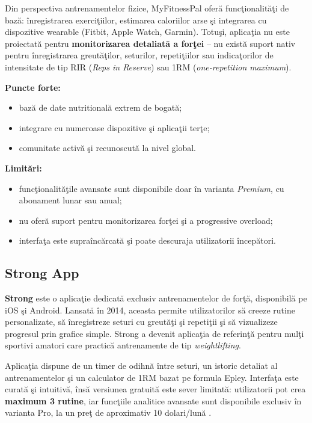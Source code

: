 Din perspectiva antrenamentelor fizice, MyFitnessPal ofer\u a func\c tionalit\u a\c ti
de baz\u a: \^ inregistrarea exerci\c tiilor, estimarea caloriilor arse \c si
integrarea cu dispozitive wearable (Fitbit, Apple Watch, Garmin). Totu\c si,
aplica\c tia nu este proiectat\u a pentru \textbf{monitorizarea detaliat\u a a
for\c tei} -- nu exist\u a suport nativ pentru \^ inregistrarea greut\u a\c tilor,
seturilor, repeti\c tiilor sau indica\c torilor de intensitate de tip RIR
(\textit{Reps in Reserve}) sau 1RM (\textit{one-repetition maximum}).

\textbf{Puncte forte:}
\begin{itemize}
  \item baz\u a de date nutritional\u a extrem de bogat\u a;
  \item integrare cu numeroase dispozitive \c si aplica\c tii ter\c te;
  \item comunitate activ\u a \c si recunoscut\u a la nivel global.
\end{itemize}

\textbf{Limit\u ari:}
\begin{itemize}
  \item func\c tionalit\u a\c tile avansate sunt disponibile doar \^ in varianta
        \textit{Premium}, cu abonament lunar sau anual;
  \item nu ofer\u a suport pentru monitorizarea for\c tei \c si a
        progressive overload;
  \item interfa\c ta este supra\^ inc\u arcat\u a \c si poate descuraja
        utilizatorii \^ incep\u atori.
\end{itemize}

\subsection{Strong App}

\textbf{Strong} \cite{strongapp2024} este o aplica\c tie dedicat\u a exclusiv
antrenamentelor de for\c t\u a, disponibil\u a pe iOS \c si Android. Lansat\u a
\^ in 2014, aceasta permite utilizatorilor s\u a creeze rutine personalizate,
s\u a \^ inregistreze seturi cu greut\u a\c ti \c si repeti\c tii \c si s\u a
vizualizeze progresul prin grafice simple. Strong a devenit aplica\c tia
de referin\c t\u a pentru mul\c ti sportivi amatori care practic\u a
antrenamente de tip \textit{weightlifting}.

Aplica\c tia dispune de un timer de odihn\u a \^ intre seturi, un istoric
detaliat al antrenamentelor \c si un calculator de 1RM bazat pe formula
Epley. Interfa\c ta este curat\u a \c si intuitiv\u a, \^ ins\u a versiunea
gratuit\u a este sever limitat\u a: utilizatorii pot crea \textbf{maximum 3
rutine}, iar func\c tiile analitice avansate sunt disponibile exclusiv
\^ in varianta Pro, la un pre\c t de aproximativ 10 dolari/lun\u a
\cite{strongapp2024}.

